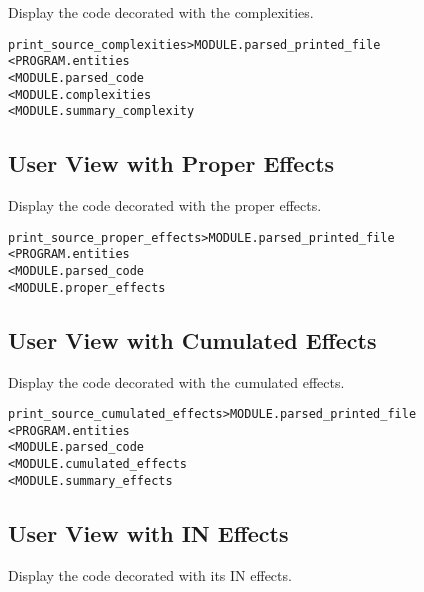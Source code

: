 \documentclass[a4paper]{report}
\newenvironment{PipsMake}{\begin{alltt}}{\end{alltt}}
\newenvironment{PipsPass}[1]{\label{pass:#1}}{}
\begin{document}
\begin{PipsPass}{print_source_complexities}
Display the code decorated with the complexities.
\end{PipsPass}

\begin{PipsMake}
print_source_complexities         > MODULE.parsed_printed_file
        < PROGRAM.entities
        < MODULE.parsed_code
        < MODULE.complexities
        < MODULE.summary_complexity
\end{PipsMake}

\subsection{User View with Proper Effects}

\begin{PipsPass}{print_source_proper_effects}
Display the code decorated with the proper effects.
\end{PipsPass}

\begin{PipsMake}
print_source_proper_effects       > MODULE.parsed_printed_file
        < PROGRAM.entities
        < MODULE.parsed_code
        <  MODULE.proper_effects
\end{PipsMake}

\subsection{User View with Cumulated Effects}

\begin{PipsPass}{print_source_cumulated_effects}
Display the code decorated with the cumulated effects.
\end{PipsPass}

\begin{PipsMake}
print_source_cumulated_effects    > MODULE.parsed_printed_file
        < PROGRAM.entities
        < MODULE.parsed_code
        < MODULE.cumulated_effects
        < MODULE.summary_effects
\end{PipsMake}

\subsection{User View with IN Effects}
\begin{PipsPass}{print_source_in_effects}
Display the code decorated with its IN effects.
\end{PipsPass}
\end{document}
